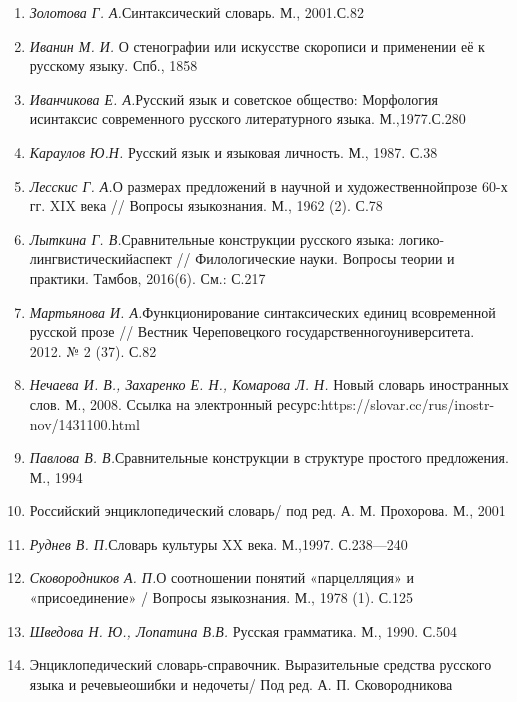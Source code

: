 \begin{enumerate}
        \item \textit{Золотова Г. А.}Синтаксический словарь. М., 2001.С.82
        \item \textit{Иванин М. И. }О стенографии или искусстве скорописи и применении её к русскому языку. Спб., 1858
        \item \textit{Иванчикова Е. А.}{Русский язык и советское общество: Морфология исинтаксис современного русского литературного языка. М.,1977.}{С.280}
        \item \textit{Караулов  Ю.Н. }{Русский язык и языковая личность. М., 1987. С.38}
        \item \textit{Лесскис Г. А.}О размерах предложений в научной и художественнойпрозе 60-х гг. XIX века // Вопросы языкознания. М., 1962 (2). С.78
        \item \textit{Лыткина Г. В.}Сравнительные конструкции русского языка: логико-лингвистическийаспект // Филологические науки. Вопросы теории и практики. Тамбов, 2016(6). См.: С.217
        \item \textit{Мартьянова И. А.}Функционирование синтаксических единиц всовременной русской прозе // Вестник Череповецкого государственногоуниверситета. 2012. № 2 (37). С.82
        \item \textit{Нечаева И. В., Захаренко Е. Н., Комарова Л. Н. }Новый словарь иностранных слов. М., 2008. Ссылка на электронный ресурс:https://slovar.cc/rus/inostr-nov/1431100.html
        \item \textit{Павлова В. В.}Сравнительные конструкции в структуре простого предложения. М., 1994
        \item Российский энциклопедический словарь/ под ред. А. М. Прохорова. М., 2001 
        \item \textit{Руднев В. П.}Словарь культуры XX века. М.,1997. С.238—240 
        \item \textit{Сковородников А. П.}О соотношении понятий «парцелляция» и «присоединение» / Вопросы языкознания. М., 1978 (1). С.125
        \item \textit{Шведова Н. Ю., Лопатина В.В. }Русская грамматика. М., 1990. С.504
        \item Энциклопедический словарь-справочник. Выразительные средства русского языка и речевыеошибки и недочеты/ Под ред. А. П. Сковородникова
      \end{enumerate}